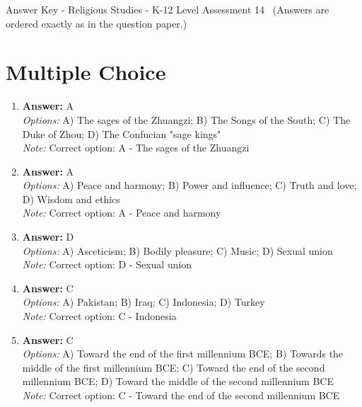 \documentclass[12pt]{article}
\begin{document}
\begin{center}
Answer Key - Religious Studies - K-12 Level Assessment 14 \
\small (Answers are ordered exactly as in the question paper.)
\end{center}

\section*{Multiple Choice}
\begin{enumerate}[label=\arabic*.]
\item \textbf{Answer:} A
\\ \textit{Options:} A) The sages of the Zhuangzi; B) The Songs of the South; C) The Duke of Zhou; D) The Confucian "sage kings"
\\ \textit{Note:} Correct option: A - The sages of the Zhuangzi
\item \textbf{Answer:} A
\\ \textit{Options:} A) Peace and harmony; B) Power and influence; C) Truth and love; D) Wisdom and ethics
\\ \textit{Note:} Correct option: A - Peace and harmony
\item \textbf{Answer:} D
\\ \textit{Options:} A) Asceticism; B) Bodily pleasure; C) Music; D) Sexual union
\\ \textit{Note:} Correct option: D - Sexual union
\item \textbf{Answer:} C
\\ \textit{Options:} A) Pakistan; B) Iraq; C) Indonesia; D) Turkey
\\ \textit{Note:} Correct option: C - Indonesia
\item \textbf{Answer:} C
\\ \textit{Options:} A) Toward the end of the first millennium BCE; B) Towards the middle of the first millennium BCE; C) Toward the end of the second millennium BCE; D) Toward the middle of the second millennium BCE
\\ \textit{Note:} Correct option: C - Toward the end of the second millennium BCE
\end{enumerate}
\end{document}
